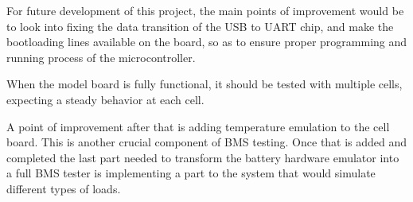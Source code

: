 \IEEEPARstart
{F}{or} future development of this project, the main points of improvement would be 
to look into fixing the data transition of the USB to UART chip, and make the 
bootloading lines available on the board, so as to ensure proper programming and 
running process of the microcontroller. 

When the model board is fully functional, it should be tested with multiple cells, 
expecting a steady behavior at each cell.

A point of improvement after that is adding temperature emulation to the cell board. 
This is another crucial component of BMS testing. Once that is added and completed 
the last part needed to transform the battery hardware emulator into a full BMS 
tester is implementing a part to the system that would simulate different types of 
loads. 
